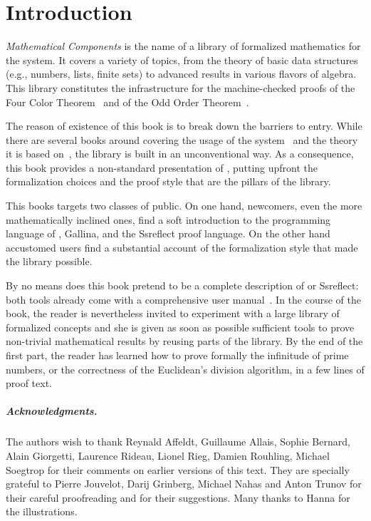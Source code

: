 \setcounter{chapter}{-1}
\chapter{Introduction}

\emph{Mathematical Components}
is the name of a library of formalized mathematics for the
\Coq{} system.  It covers a variety of
topics, from the theory of basic data structures (e.g., numbers, lists, finite
sets) to advanced results in various flavors of algebra. This library
constitutes the infrastructure for the machine-checked proofs of the
Four Color Theorem~\cite{Gonthier08} and of the
Odd Order Theorem~\cite{gonthier:hal-00816699}.

The reason of existence of this book is to break down the barriers to entry.
While there are several books around covering the usage of the
\Coq{} system~\cite{BC04,SF,CPDT}
and the theory it is based
on~\cite[chapter 4]{Coq:manual}\cite{paulinmohring:hal-01094195,hottbook},
the \mcbMC{} library is built
in an unconventional way.  As a consequence, this book provides a
non-standard presentation of \Coq{}, putting upfront the formalization
choices and the proof style that are the pillars of the library.

This books targets two classes of public.  On one hand, newcomers,
even the more mathematically inclined ones, %
find a soft
introduction to the programming
language of \Coq{}, Gallina, and the Ssreflect proof language.
On the other hand accustomed \Coq{} users %
find a
substantial account of the formalization style that made the \mcbMC{}
library possible.


By no means does this book pretend to be a complete description of \Coq{} or
Ssreflect: both tools already come with a comprehensive user
manual~\cite{Coq:manual,ssrman}.
In the course of the book, the reader is nevertheless invited to
experiment with  a large library of formalized concepts and she is
given as soon as possible sufficient tools to prove non-trivial
mathematical results by reusing parts of the library. By the end of
the first part, the reader has learned how to prove formally the
infinitude of prime numbers, or the correctness of the Euclidean's
division algorithm, in a few lines of proof text.

\paragraph{Acknowledgments.} The authors wish to thank
Reynald Affeldt, Guillaume Allais, Sophie Bernard, Alain Giorgetti,
Laurence Rideau, Lionel Rieg,
Damien Rouhling, Michael Soegtrop for their comments
on earlier versions of this text. They are specially grateful to
Pierre Jouvelot, Darij Grinberg, Michael Nahas and Anton Trunov for
their careful proofreading and for their suggestions. Many thanks to
Hanna for the illustrations.

